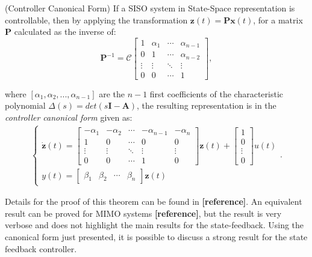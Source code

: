 \documentclass[a4paper,11pt]{book}
\numberwithin{figure}{chapter}
\numberwithin{equation}{chapter}
\numberwithin{table}{chapter}
\newtheorem{theorem}{Theorem}[chapter]
\theoremstyle{definition}
\newcounter{boxed-theorem}
\newenvironment{boxed-theorem}[1]
{\colorlet{shadecolor}{pastelBlue2!10} \begin{shaded} \begin{theorem}{#1}}
{\end{theorem} \end{shaded}}
\newcounter{boxed-definition}
\newcounter{boxed-example}
\begin{document}
\begin{boxed-theorem}{(Controller Canonical Form)} \label{th:controlCanon}
    If a SISO system in State-Space representation is controllable, then by applying the transformation $\bm{z}(t) = \bm{P}\bm{x}(t)$, for a matrix $\bm{P}$ calculated as the inverse of:
    \begin{equation}
        \bm{P}^{-1} = \bm{\mathcal{C}} \begin{bmatrix}
        1 & \alpha_1 & \cdots  & \alpha_{n-1} \\
        0 & 1 & \cdots & \alpha_{n-2} \\
        \vdots & \vdots & \ddots & \vdots \\
        0 & 0 & \cdots &1
        \end{bmatrix}
    ,\end{equation}
    
    \noindent where $[\alpha_1, \alpha_2, ..., \alpha_{n-1}]$ are the $n-1$ first coefficients of the characteristic polynomial $\Delta(s) = det(s\bm{I} - \bm{A})$, the resulting representation is in the \textit{controller canonical form} given as:
    \begin{align}
    \begin{cases}
        \dot{\bm{z}}(t) = \begin{bmatrix}
            -\alpha_1 & -\alpha_2 & \cdots & -\alpha_{n-1} & -\alpha_n \\
            1 & 0 & \cdots & 0 & 0 \\
            \vdots & \vdots & \ddots & \vdots & \vdots \\
            0 & 0 & \cdots & 1 & 0 
        \end{bmatrix} \bm{z}(t) + \begin{bmatrix}
            1 \\ 0 \\ \vdots \\ 0
        \end{bmatrix} u(t) \\
        y(t) = \begin{bmatrix} \beta_1 & \beta_2 & \cdots & \beta_n \end{bmatrix} \bm{z}(t)
    \end{cases}
    .\end{align}
\end{boxed-theorem} 

Details for the proof of this theorem can be found in \textbf{[reference]}. An equivalent result can be proved for MIMO systems \textbf{[reference]}, but the result is very verbose and does not highlight the main results for the state-feedback. Using the canonical form just presented, it is possible to discuss a strong result for the state feedback controller.
\end{document}
